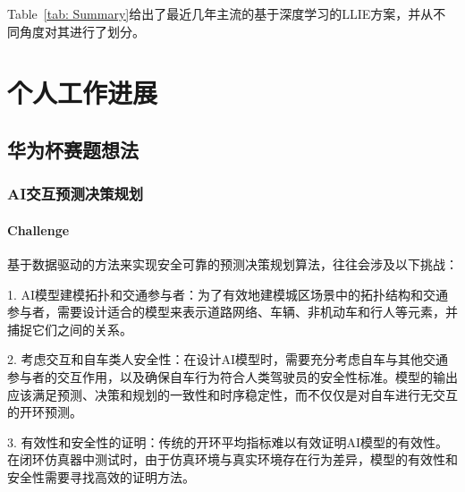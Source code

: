 \documentclass[letterpaper,12pt]{article}
\begin{document}
\begin{table}[!htbp]
{\begin{tabular}
				\hline
			\end{tabular}
		}
		\captionsetup{font=scriptsize} %
		\caption{\label{tab: Summary}
			Summary of essential characteristics of representative deep learning-based methods, including learning strategies, network structures, loss functions, training datasets, testing datasets, evaluation metrics, data formats of input, and whether the models are Retinex-based or not. "simulated" means the testing data are simulated by the same approach as the synthetic training data. "self-selected" stands for the real-world images selected by the authors. "\#P" represents the number of trainable parameters. "-" means this item is not available or not indicated in the paper.} %
		
	\end{table}
	
	Table~\ref{tab: Summary}给出了最近几年主流的基于深度学习的LLIE方案，并从不同角度对其进行了划分。
	
	\section{个人工作进展}
	
	\subsection{华为杯赛题想法}
	
	\subsubsection{AI交互预测决策规划}
	
	\paragraph{Challenge}
	基于数据驱动的方法来实现安全可靠的预测决策规划算法，往往会涉及以下挑战：
	
	1. AI模型建模拓扑和交通参与者：为了有效地建模城区场景中的拓扑结构和交通参与者，需要设计适合的模型来表示道路网络、车辆、非机动车和行人等元素，并捕捉它们之间的关系。
	
	2. 考虑交互和自车类人安全性：在设计AI模型时，需要充分考虑自车与其他交通参与者的交互作用，以及确保自车行为符合人类驾驶员的安全性标准。模型的输出应该满足预测、决策和规划的一致性和时序稳定性，而不仅仅是对自车进行无交互的开环预测。
	
	3. 有效性和安全性的证明：传统的开环平均指标难以有效证明AI模型的有效性。在闭环仿真器中测试时，由于仿真环境与真实环境存在行为差异，模型的有效性和安全性需要寻找高效的证明方法。
	
\end{document}
